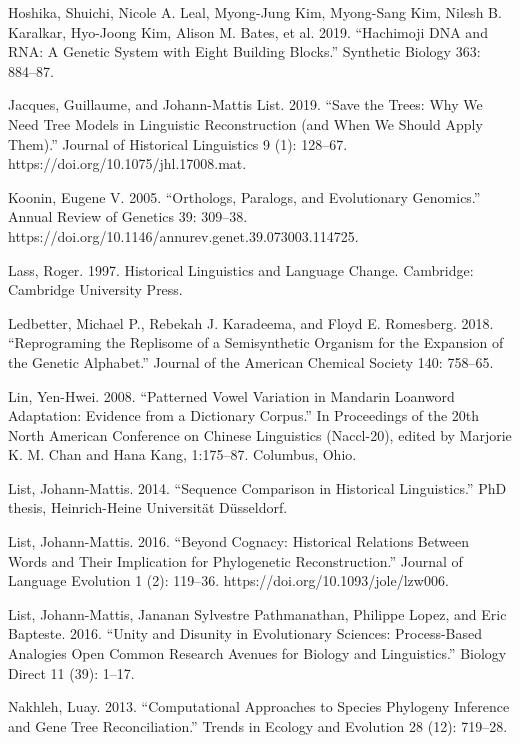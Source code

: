 \documentclass[
  a4paper,
  14pt,
  oneside,
  tablecaptionabove
]{scrbook}
\begin{document}
\nopagebreak\hangindent=0.7cm {\small
Hoshika, Shuichi, Nicole A. Leal, Myong-Jung Kim, Myong-Sang Kim, Nilesh B. Karalkar, Hyo-Joong Kim, Alison M. Bates, et al. 2019. “Hachimoji DNA and RNA: A Genetic System with Eight Building Blocks.” Synthetic Biology 363: 884–87.
}

\nopagebreak\hangindent=0.7cm {\small
Jacques, Guillaume, and Johann-Mattis List. 2019. “Save the Trees: Why We Need Tree Models in Linguistic Reconstruction (and When We Should Apply Them).” Journal of Historical Linguistics 9 (1): 128–67. https://doi.org/10.1075/jhl.17008.mat.
}

\nopagebreak\hangindent=0.7cm {\small
Koonin, Eugene V. 2005. “Orthologs, Paralogs, and Evolutionary Genomics.” Annual Review of Genetics 39: 309–38. https://doi.org/10.1146/annurev.genet.39.073003.114725.
}

\nopagebreak\hangindent=0.7cm {\small
Lass, Roger. 1997. Historical Linguistics and Language Change. Cambridge: Cambridge University Press.
}

\nopagebreak\hangindent=0.7cm {\small
Ledbetter, Michael P., Rebekah J. Karadeema, and Floyd E. Romesberg. 2018. “Reprograming the Replisome of a Semisynthetic Organism for the Expansion of the Genetic Alphabet.” Journal of the American Chemical Society 140: 758–65.
}

\nopagebreak\hangindent=0.7cm {\small
Lin, Yen-Hwei. 2008. “Patterned Vowel Variation in Mandarin Loanword Adaptation: Evidence from a Dictionary Corpus.” In Proceedings of the 20th North American Conference on Chinese Linguistics (Naccl-20), edited by Marjorie K. M. Chan and Hana Kang, 1:175–87. Columbus, Ohio.
}

\nopagebreak\hangindent=0.7cm {\small
List, Johann-Mattis. 2014. “Sequence Comparison in Historical Linguistics.” PhD thesis, Heinrich-Heine Universität Düsseldorf.
}

\nopagebreak\hangindent=0.7cm {\small
List, Johann-Mattis. 2016. “Beyond Cognacy: Historical Relations Between Words and Their Implication for Phylogenetic Reconstruction.” Journal of Language Evolution 1 (2): 119–36. https://doi.org/10.1093/jole/lzw006.
}

\nopagebreak\hangindent=0.7cm {\small
List, Johann-Mattis, Jananan Sylvestre Pathmanathan, Philippe Lopez, and Eric Bapteste. 2016. “Unity and Disunity in Evolutionary Sciences: Process-Based Analogies Open Common Research Avenues for Biology and Linguistics.” Biology Direct 11 (39): 1–17.
}

\nopagebreak\hangindent=0.7cm {\small
Nakhleh, Luay. 2013. “Computational Approaches to Species Phylogeny Inference and Gene Tree Reconciliation.” Trends in Ecology and Evolution 28 (12): 719–28.
}
\end{document}
